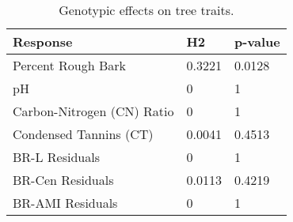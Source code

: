 \begin{table}[ht]
\centering
\begin{tabular}{lll}
  \hline
Response & H2 & p-value \\ 
  \hline
  Percent Rough Bark & 0.3221 & 0.0128 \\ 
  pH & 0 & 1 \\ 
  Carbon-Nitrogen (CN) Ratio & 0 & 1 \\ 
  Condensed Tannins (CT) & 0.0041 & 0.4513 \\ 
  BR-L Residuals & 0 & 1 \\ 
  BR-Cen Residuals & 0.0113 & 0.4219 \\ 
  BR-AMI Residuals & 0 & 1 \\ 
   \hline
\end{tabular}
\caption{Genotypic effects on tree traits.} 
\label{tab:h2_trait_table}
\end{table}
